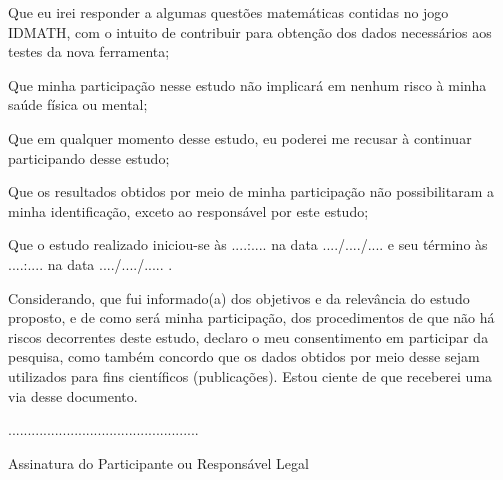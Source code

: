 \documentclass[
	12pt,				%
    oneside,			%
	a4paper,			%
	english,			%
	french,				%
	spanish,			%
	brazil,				%
	]{abntex2}
\begin{document}
\begin{apendicesenv}
	Que eu irei responder a algumas questões matemáticas contidas no jogo IDMATH, com o intuito de contribuir para obtenção dos dados necessários aos testes da nova ferramenta; 
	
	Que minha participação nesse estudo não implicará em nenhum risco à minha saúde física ou mental;
	
	Que em qualquer momento desse estudo, eu poderei me recusar à continuar participando desse estudo;
	
	Que os resultados obtidos por meio de minha participação não possibilitaram a minha identificação, exceto ao responsável por este estudo;
	
	Que o estudo realizado iniciou-se às ....:.... na data ..../..../.... e seu término às ....:.... na data ..../..../..... .

Considerando, que fui informado(a) dos objetivos e da relevância do estudo proposto, e de como será minha participação, dos procedimentos de que não há riscos decorrentes deste estudo, declaro o meu consentimento em participar da pesquisa, como também concordo que os dados obtidos por meio desse sejam utilizados para fins científicos (publicações). Estou ciente de que receberei uma via desse documento.

.................................................

Assinatura do Participante ou Responsável Legal



\end{apendicesenv}
\end{document}
